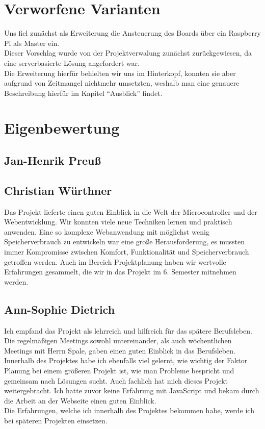 \begin{table}[H]
\begin{tabular}{p{\textwidth}|l|l|lp{\textwidth}|} \hline



\end{tabular}
\end{table}

\section{Verworfene Varianten}
Uns fiel zunächst als Erweiterung die Ansteuerung des Boards über ein Raspberry Pi als Master ein.\\
Dieser Vorschlag wurde von der Projektverwalung zunächst zurückgewiesen, da eine serverbasierte Lösung
angefordert war. \\ Die Erweiterung hierfür behielten wir uns im Hinterkopf, konnten sie aber aufgrund 
von Zeitmangel nichtmehr umsetzten, weshalb man eine genauere Beschreibung hierfür im Kapitel "`Ausblick"'
findet.
\section{Eigenbewertung}

\subsection*{Jan-Henrik Preuß}

\subsection*{Christian Würthner}
Das Projekt lieferte einen guten Einblick in die Welt der Microcontroller und
der Webentwicklung. Wir konnten viele neue Techniken lernen und praktisch
anwenden. Eine so komplexe Webanwendung mit möglichst wenig Speicherverbrauch zu
entwickeln war eine große Herausforderung, es mussten immer Kompromisse zwischen
Komfort, Funktionalität und Speicherverbrauch getroffen werden. Auch im Bereich
Projektplanung haben wir wertvolle Erfahrungen gesammelt, die wir in das Projekt
im 6. Semester mitnehmen werden.

\subsection*{Ann-Sophie Dietrich}
Ich empfand das Projekt als lehrreich und hilfreich für das spätere Berufsleben.\\
Die regelmäßigen Meetings sowohl untereinander, als auch 
wöchentlichen Meetings mit Herrn Spale, gaben einen guten Einblick in das Berufsleben.\\
Innerhalb des Projektes habe ich ebenfalls viel gelernt, wie wichtig der Faktor Planung 
bei einem größeren Projekt ist, wie man Probleme bespricht und gemeinsam nach Lösungen sucht.
Auch fachlich hat mich dieses Projekt weitergebracht. Ich hatte zuvor keine Erfahrung 
mit JavaScript und bekam durch die Arbeit an der Webseite einen guten Einblick.\\
Die Erfahrungen, welche ich innerhalb des Projektes bekommen habe, werde ich bei 
späteren Projekten einsetzen.

